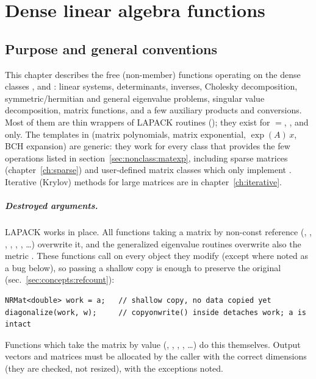 \chapter{Dense linear algebra functions}\label{ch:nonclass}

\section{Purpose and general conventions}\label{sec:nonclass:purpose}
This chapter describes the free (non-member) functions operating on the dense classes
,  and : linear systems, determinants, inverses, Cholesky
decomposition, symmetric/hermitian and general eigenvalue problems, singular value decomposition,
matrix functions, and a few auxiliary products and conversions. Most of them are thin wrappers of
LAPACK routines (); they exist for ${}={}$, ,
 and  only. The templates in  (matrix polynomials, matrix
exponential, $\exp(A)\,x$, BCH expansion) are generic: they work for every class that provides the few
operations listed in section~\ref{sec:nonclass:matexp}, including sparse matrices
(chapter~\ref{ch:sparse}) and user-defined matrix classes which only implement .
Iterative (Krylov) methods for large matrices are in chapter~\ref{ch:iterative}.

\paragraph{Destroyed arguments.} LAPACK works in place. All functions taking a matrix by non-const
reference (, , , ,
, , \dots) overwrite it, and the generalized eigenvalue
routines overwrite also the metric . These functions call  on every object they
modify (except where noted as a bug below), so passing a shallow copy is enough to preserve the
original (sec.~\ref{sec:concepts:refcount}):
\begin{lstlisting}
NRMat<double> work = a;   // shallow copy, no data copied yet
diagonalize(work, w);     // copyonwrite() inside detaches work; a is intact
\end{lstlisting}
Functions which take the matrix by value (, , ,
, \dots) do this themselves. Output vectors and matrices must be allocated by the
caller with the correct dimensions (they are checked, not resized), with the exceptions noted.

